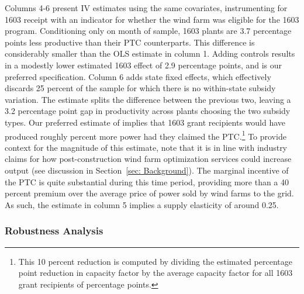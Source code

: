 \documentclass[12pt]{article}
\begin{document}
Columns 4-6 present IV estimates using the same covariates, instrumenting for 1603 receipt with an indicator for whether the wind farm was eligible for the 1603 program. Conditioning only on month of sample, 1603 plants are 3.7 percentage points less productive than their PTC counterparts. This difference is considerably smaller than the OLS estimate in column 1. Adding controls results in a modestly lower estimated 1603 effect of 2.9 percentage points, and is our preferred specification. Column 6 adds state fixed effects, which effectively discards 25 percent of the sample for which there is no within-state subsidy variation. The estimate splits the difference between the previous two, leaving a 3.2 percentage point gap in productivity across plants choosing the two subsidy types. Our preferred estimate of implies that 1603 grant recipients would have produced roughly percent more power had they claimed the PTC.\footnote{This 10 percent reduction is computed by dividing the estimated percentage point reduction in capacity factor by the average capacity factor for all 1603 grant recipients of percentage points.} To provide context for the magnitude of this estimate, note that it is in line with industry claims for how post-construction wind farm optimization services could increase output (see discussion in Section~\ref{sec: Background}). The marginal incentive of the PTC is quite substantial during this time period, providing more than a 40 percent premium over the average price of power sold by wind farms to the grid. As such, the estimate in column 5 implies a supply elasticity of around 0.25. 

\subsubsection*{Robustness Analysis}
\end{document}
